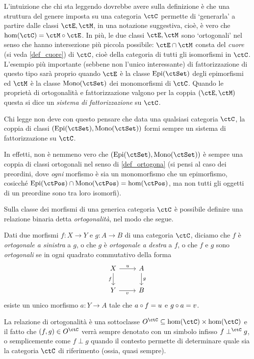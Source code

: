 L'intuizione che chi sta leggendo dovrebbe avere sulla definizione è che una struttura del genere imposta su una categoria \(\ctC\) permette di `generarla' a partire dalle classi \(\ctE,\ctM\), in una notazione suggestiva, cioè, è vero che \(\hom(\ctC) = \ctM\cmp \ctE\). In più, le due classi \(\ctE,\ctM\) sono `ortogonali' nel senso che hanno intersezione più piccola possibile: \(\ctE\cap \ctM\) consta del \emph{cuore} (si veda \ref{def_cuore}) di \(\ctC\), cioè della categoria di tutti gli isomorfismi in \(\ctC\).
\color{red}
L'esempio più importante (sebbene non l'unico interessante) di fattorizzazione di questo tipo sarà proprio quando \(\ctE\) è la classe \(\Epi\) degli epimorfismi ed \(\ctM\) è la classe \(\Mono\) dei monomorfismi di \(\ctC\). Quando le proprietà di ortogonalità e fattorizzazione valgono per la coppia \((\ctE,\ctM)\) questa si dice un \emph{sistema di fattorizzazione} su \(\ctC\).
\begin{remark}
	Chi legge non deve con questo pensare che data una qualsiasi categoria \(\ctC\), la coppia di classi \((\Epi,\Mono)\) formi sempre un sistema di fattorizzazione su \(\ctC\).

	In effetti, non è nemmeno vero che \((\Epi,\Mono)\) è sempre una coppia di classi ortogonali nel senso di \ref{def_ortogona} (si pensi al caso dei preordini, dove \emph{ogni} morfismo è sia un monomorfismo che un epimorfismo, cosicché \(\Epi[\ctPos]\cap\Mono[\ctPos]=\hom(\ctPos)\), ma non tutti gli oggetti di un preordine sono tra loro isomorfi).
\end{remark}
\color{black}
Sulla classe dei morfismi di una generica categoria \(\ctC\) è possibile definire una relazione binaria detta \emph{ortogonalità}, nel modo che segue.
\begin{definition}\label{def_ortogona}
	Dati due morfismi \(f : X\to Y\) e \(g : A\to B\) di una categoria $\ctC$, diciamo che \(f\) è \emph{ortogonale a sinistra} a \(g\), o che \(g\) è \emph{ortogonale a destra} a \(f\), o che \(f\) e \(g\) sono \emph{ortogonali} se in ogni quadrato commutativo della forma
	\[
		\begin{tikzcd}
			X \ar[d, "f"']\ar[r, "u"]& A\ar[d, "g"] \\
			Y \ar[r, "v"']& B
		\end{tikzcd}
	\]
	esiste un unico morfismo \(a : Y\to A\) tale che \(a\circ f=u\) e \(g\circ a=v\).
\end{definition}
La relazione di ortogonalità è una sottoclasse \(O^\ctC \subseteq \hom(\ctC)\times\hom(\ctC)\) e il fatto che \((f,g)\in O^\ctC\) verrà sempre denotato con un simbolo infisso \(f\perp^\ctC g\), o semplicemente come \(f\perp g\) quando il contesto permette di determinare quale sia la categoria \(\ctC\) di riferimento (ossia, quasi sempre).

